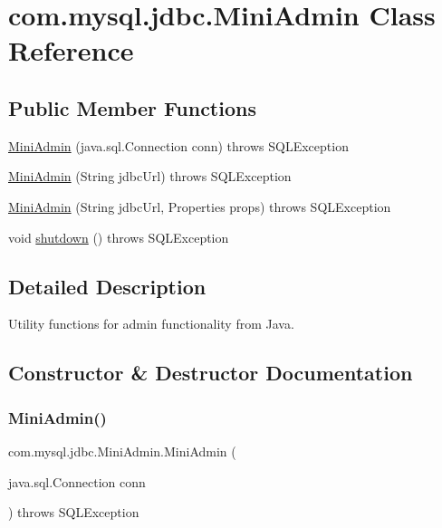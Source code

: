 \hypertarget{classcom_1_1mysql_1_1jdbc_1_1_mini_admin}{}\section{com.\+mysql.\+jdbc.\+Mini\+Admin Class Reference}
\label{classcom_1_1mysql_1_1jdbc_1_1_mini_admin}
\subsection*{Public Member Functions}
\begin{DoxyCompactItemize}
\item 
\mbox{\hyperlink{classcom_1_1mysql_1_1jdbc_1_1_mini_admin_a351df7f2a1e2688d3c4db674af597cb1}{Mini\+Admin}} (java.\+sql.\+Connection conn)  throws S\+Q\+L\+Exception 
\item 
\mbox{\hyperlink{classcom_1_1mysql_1_1jdbc_1_1_mini_admin_aa0ece5f491867b8f71b0441df770f431}{Mini\+Admin}} (String jdbc\+Url)  throws S\+Q\+L\+Exception 
\item 
\mbox{\hyperlink{classcom_1_1mysql_1_1jdbc_1_1_mini_admin_a5177d105f0850fa5b293e71255803260}{Mini\+Admin}} (String jdbc\+Url, Properties props)  throws S\+Q\+L\+Exception 
\item 
void \mbox{\hyperlink{classcom_1_1mysql_1_1jdbc_1_1_mini_admin_a2d976dc99e2fd7ea82cf744a6156d4d6}{shutdown}} ()  throws S\+Q\+L\+Exception 
\end{DoxyCompactItemize}


\subsection{Detailed Description}
Utility functions for admin functionality from Java. 

\subsection{Constructor \& Destructor Documentation}
\mbox{\label{classcom_1_1mysql_1_1jdbc_1_1_mini_admin_a351df7f2a1e2688d3c4db674af597cb1}} 
\subsubsection{\texorpdfstring{Mini\+Admin()}{MiniAdmin()}\hspace{0.1cm}{\footnotesize\ttfamily [1/3]}}
{\footnotesize\ttfamily com.\+mysql.\+jdbc.\+Mini\+Admin.\+Mini\+Admin (\begin{DoxyParamCaption}\item[{java.\+sql.\+Connection}]{conn }\end{DoxyParamCaption}) throws S\+Q\+L\+Exception}

